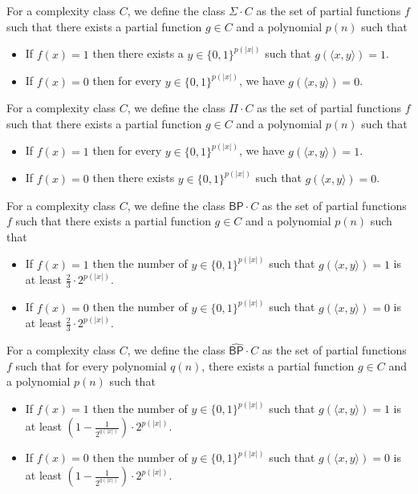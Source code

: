 \documentclass[11pt]{article}
\newcommand{\bp}{\textsf{BP}}
\newcommand{\strongbp}{\widehat{\textsf{BP}}}
\begin{document}
\begin{definition}\label{opsigma}
For a complexity class $C$, we define the class $\Sigma \cdot C$ as the set of partial functions $f$ such that there exists a partial function $g \in C$ and a polynomial $p(n)$ such that
\begin{itemize}
\item If $f(x) = 1$ then there exists a $y \in \{0,1\}^{p(|x|)}$ such that $g(\langle x,y \rangle) = 1$.
\item If $f(x) = 0$ then for every $y \in \{0,1\}^{p(|x|)}$, we have $g(\langle x, y\rangle) = 0$.
\end{itemize}
\end{definition}

\begin{definition}\label{oppi}
For a complexity class $C$, we define the class $\Pi \cdot C$ as the set of partial functions $f$ such that there exists a partial function $g \in C$ and a polynomial $p(n)$ such that
\begin{itemize}
\item If $f(x) = 1$ then for every $y \in \{0,1\}^{p(|x|)}$, we have $g(\langle x,y \rangle) = 1$.
\item If $f(x) = 0$ then there exists $y \in \{0,1\}^{p(|x|)}$ such that $g(\langle x, y\rangle) = 0$.
\end{itemize}
\end{definition}

\begin{definition}\label{opbp}
For a complexity class $C$, we define the class $\bp\cdot C$ as the set of partial functions $f$ such that there exists a partial function $g \in C$ and a polynomial $p(n)$ such that
\begin{itemize}
\item If $f(x) = 1$ then the number of $y \in \{0,1\}^{p(|x|)}$ such that $g(\langle x, y\rangle) = 1$ is at least $\frac{2}{3}\cdot 2^{p(|x|)}$.
\item If $f(x) = 0$ then the number of $y \in \{0,1\}^{p(|x|)}$ such that $g(\langle x, y\rangle) = 0$ is at least $\frac{2}{3}\cdot 2^{p(|x|)}$.
\end{itemize}
\end{definition}

\begin{definition}\label{opstrongbp}
For a complexity class $C$, we define the class $\strongbp\cdot C$ as the set of partial functions $f$ such that for every polynomial $q(n)$, there exists a partial function $g \in C$ and a polynomial $p(n)$ such that
\begin{itemize}
\item If $f(x) = 1$ then the number of $y \in \{0,1\}^{p(|x|)}$ such that $g(\langle x, y \rangle) = 1$ is at least \linebreak$\left(1 - \frac{1}{2^{q(|x|)}}\right)\cdot 2^{p(|x|)}$.
\item If $f(x) = 0$ then the number of $y \in \{0,1\}^{p(|x|)}$ such that $g(\langle x, y \rangle) = 0$ is at least \linebreak$\left(1 - \frac{1}{2^{q(|x|)}}\right)\cdot 2^{p(|x|)}$.
\end{itemize}
\end{definition}
\end{document}
